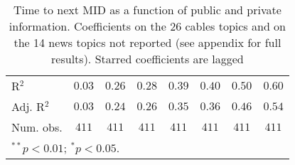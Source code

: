 \begin{table}
\begin{center}
\begin{footnotesize}
\begin{tabular}{l c c c c c c c}
R$^2$                  & $0.03$        & $0.26$           & $0.28$           & $0.39$           & $0.40$           & $0.50$           & $0.60$           \\
Adj. R$^2$             & $0.03$        & $0.24$           & $0.26$           & $0.35$           & $0.36$           & $0.46$           & $0.54$           \\
Num. obs.              & $411$         & $411$            & $411$            & $411$            & $411$            & $411$            & $411$            \\
\hline
\multicolumn{8}{l}{\tiny{$^{**}p<0.01$; $^{*}p<0.05$.}}
\end{tabular}
\end{footnotesize}
\caption{Time to next MID as a function of public and private information. Coefficients on the 26 cables topics and on the 14 news topics not reported (see appendix for full results).  Starred coefficients are lagged}
\label{table:coefficients}
\end{center}
\end{table}
